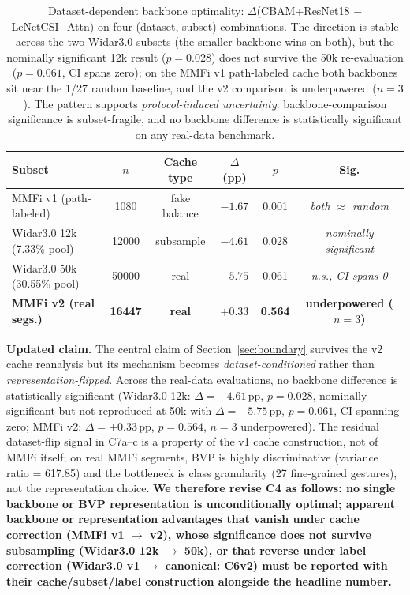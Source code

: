 \documentclass[11pt]{article}
\theoremstyle{definition}
\begin{document}
\begin{table}[!t]
    \centering
    \caption{Dataset-dependent backbone optimality: $\Delta$(CBAM+ResNet18 $-$ LeNetCSI\_Attn) on four (dataset, subset) combinations. The direction is stable across the two Widar3.0 subsets (the smaller backbone wins on both), but the nominally significant 12k result ($p = 0.028$) does not survive the 50k re-evaluation ($p = 0.061$, CI spans zero); on the MMFi v1 path-labeled cache both backbones sit near the 1/27 random baseline, and the v2 comparison is underpowered ($n{=}3$). The pattern supports \emph{protocol-induced uncertainty}: backbone-comparison significance is subset-fragile, and no backbone difference is statistically significant on any real-data benchmark.}
    \label{tab:ddopt}
    \scriptsize
    \setlength{\tabcolsep}{4pt}
    \begin{tabular}{lccccc}
    \toprule
    Subset & $n$ & Cache type & $\Delta$(pp) & $p$ & Sig. \\
    \midrule
    MMFi v1 (path-labeled)       & 1080  & fake balance & $-1.67$    & 0.001  & \emph{both $\approx$ random} \\
    Widar3.0 12k (7.33\% pool)   & 12000 & subsample    & $-4.61$    & 0.028  & \emph{nominally significant} \\
    Widar3.0 50k (30.55\% pool)  & 50000 & real         & $-5.75$    & 0.061  & \emph{n.s., CI spans 0} \\
    \textbf{MMFi v2 (real segs.)} & \textbf{16447} & \textbf{real} & $\mathbf{+0.33}$ & \textbf{0.564} & \textbf{underpowered ($n{=}3$)} \\
    \bottomrule
    \end{tabular}
\end{table}

\textbf{Updated claim.} The central claim of Section~\ref{sec:boundary} survives the v2 cache reanalysis but its mechanism becomes \emph{dataset-conditioned} rather than \emph{representation-flipped}. Across the real-data evaluations, no backbone difference is statistically significant (Widar3.0 12k: $\Delta = -4.61$\,pp, $p = 0.028$, nominally significant but not reproduced at 50k with $\Delta = -5.75$\,pp, $p = 0.061$, CI spanning zero; MMFi v2: $\Delta = +0.33$\,pp, $p = 0.564$, $n{=}3$ underpowered). The residual dataset-flip signal in C7a--c is a property of the v1 cache construction, not of MMFi itself; on real MMFi segments, BVP is highly discriminative (variance ratio = 617.85) and the bottleneck is class granularity (27 fine-grained gestures), not the representation choice. \textbf{We therefore revise C4 as follows: no single backbone or BVP representation is unconditionally optimal; apparent backbone or representation advantages that vanish under cache correction (MMFi v1 $\to$ v2), whose significance does not survive subsampling (Widar3.0 12k $\to$ 50k), or that reverse under label correction (Widar3.0 v1 $\to$ canonical: C6v2) must be reported with their cache/subset/label construction alongside the headline number.}
\end{document}
